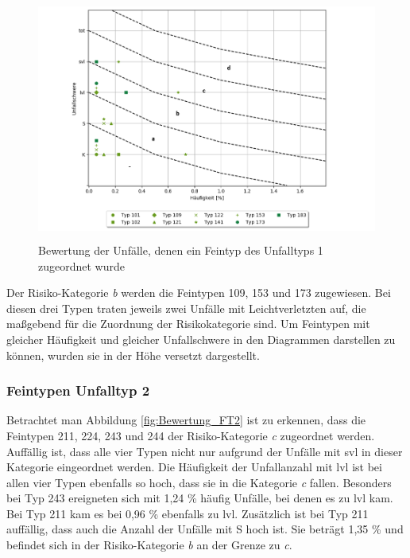 \begin{savenotes}
	\begin{figure}[H]
		\centering
		\includegraphics[width=12cm,height=8cm]{figures/Bewertung_FT1}
		\caption[Bewertung der Unfälle, denen ein Feintyp des Unfalltyps 1 zugeordnet wurde]{Bewertung der Unfälle, denen ein Feintyp des Unfalltyps 1 zugeordnet wurde}\label{fig:Bewertung_FT1}
	\end{figure}
\end{savenotes}

Der Risiko-Kategorie \textit{b} werden die Feintypen 109, 153 und 173 zugewiesen. Bei diesen drei Typen traten jeweils zwei Unfälle mit Leichtverletzten auf, die maßgebend für die Zuordnung der Risikokategorie sind. Um Feintypen mit gleicher Häufigkeit und gleicher Unfallschwere in den Diagrammen darstellen zu können, wurden sie in der Höhe versetzt dargestellt.

\subsubsection{Feintypen Unfalltyp 2}
Betrachtet man Abbildung \ref{fig:Bewertung_FT2} ist zu erkennen, dass die Feintypen 211, 224, 243 und 244 der Risiko-Kategorie \textit{c} zugeordnet werden. Auffällig ist, dass alle vier Typen nicht nur aufgrund der Unfälle mit \ac{svl} in dieser Kategorie eingeordnet werden. Die Häufigkeit der Unfallanzahl mit \ac{lvl} ist bei allen vier Typen ebenfalls so hoch, dass sie in die Kategorie \textit{c} fallen. Besonders bei Typ 243 ereigneten sich mit 1,24 \% häufig Unfälle, bei denen es zu \ac{lvl} kam. Bei Typ 211 kam es bei 0,96 \% ebenfalls zu \ac{lvl}. Zusätzlich ist bei Typ 211 auffällig, dass auch die Anzahl der Unfälle mit \ac{S} hoch ist. Sie beträgt 1,35 \% und befindet sich in der Risiko-Kategorie \textit{b} an der Grenze zu \textit{c}.

